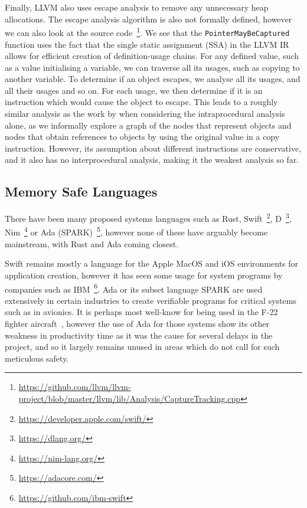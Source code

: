 \documentclass{proposal}
\begin{document}
    Finally, LLVM also uses escape analysis to remove any unnecessary heap allocations.
    The escape analysis algorithm is also not formally defined, however we can also look at the source code~\footnote{\url{https://github.com/llvm/llvm-project/blob/master/llvm/lib/Analysis/CaptureTracking.cpp}}.
    We see that the \texttt{PointerMayBeCaptured} function uses the fact that the single static assignment (SSA) in the LLVM IR allows for efficient creation of definition-usage chains.
    For any defined value, such as a value initialising a variable, we can traverse all its usages, such as copying to another variable.
    To determine if an object escapes, we analyse all its usages, and all their usages and so on.
    For each usage, we then determine if it is an instruction which would cause the object to escape.
    This leads to a roughly similar analysis as the work by \citet{Choi1999} when considering the intraprocedural analysis alone, as we informally explore a graph of the nodes that represent objects and nodes that obtain references to objects by using the original value in a copy instruction.
    However, its assumption about different instructions are conservative, and it also has no interprocedural analysis, making it the weakest analysis so far.

    \subsection{Memory Safe Languages}\label{subsec:rust}

    There have been many proposed systems languages such as Rust, Swift~\footnote{\url{https://developer.apple.com/swift/}}, D~\footnote{\url{https://dlang.org/}}, Nim~\footnote{\url{https://nim-lang.org/}} or Ada (SPARK)~\footnote{\url{https://adacore.com/}}, however none of these have arguably become mainstream, with Rust and Ada coming closest.

    Swift remains mostly a language for the Apple MacOS and iOS environments for application creation, however it has seen some usage for system programs by companies such as IBM~\footnote{\url{https://github.com/ibm-swift}}.
    Ada or its subset language SPARK are used extensively in certain industries to create verifiable programs for critical systems such as in avionics.
    It is perhaps most well-know for being used in the F-22 fighter aircraft~\cite{Malas1997}, however the use of Ada for those systems show its other weakness in productivity time as it was the cause for several delays in the project, and so it largely remains unused in areas which do not call for such meticulous safety.
\end{document}
